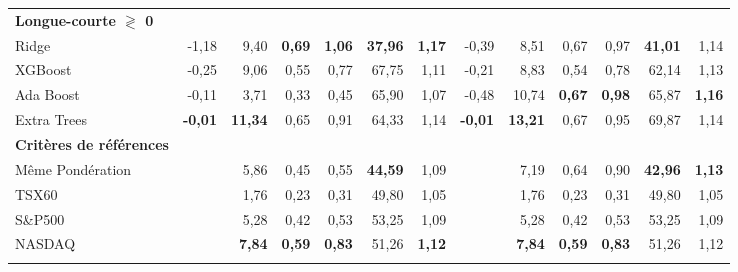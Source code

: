 \documentclass[11pt]{article}
\begin{document}
\begin{table}[h]
{\begin{tabular}{l *{6}{R} | *{6}{R}}
\textbf{Longue-courte $\gtrless$ 0} & & & & & & & & & & & & \\
\addlinespace[0.1cm]
Ridge & -1,18 & 9,40 & \bfseries0,69 & \bfseries1,06 & \bfseries\color{Green}37,96 & \bfseries\color{Green}1,17 & -0,39 & 8,51 & 0,67 & 0,97 & \bfseries\color{Green}41,01 & 1,14 \\ \addlinespace[0.1cm]
XGBoost & -0,25 & 9,06 & 0,55 & 0,77 & 67,75 & 1,11 & -0,21 & 8,83 & 0,54 & 0,78 & 62,14 & 1,13 \\ \addlinespace[0.1cm]
Ada Boost & -0,11 & 3,71 & 0,33 & 0,45 & 65,90 & 1,07 & -0,48 & 10,74 & \bfseries0,67 & \bfseries0,98 & 65,87 & \bfseries\color{Green}1,16 \\ \addlinespace[0.1cm]
Extra Trees & \bfseries\color{Green}-0,01 & \bfseries11,34 & 0,65 & 0,91 & 64,33 & 1,14 & \bfseries\color{Green}-0,01 & \bfseries13,21 & 0,67 & 0,95 & 69,87 & 1,14 \\ \addlinespace[0.1cm]
\textbf{Critères de références} & & & & & & & & & & & & \\
\addlinespace[0.1cm]
Même Pondération & & 5,86 & 0,45 & 0,55 & \bfseries44,59 & 1,09 & & 7,19 & 0,64 & 0,90 & \bfseries42,96 & \bfseries1,13 \\ 
\addlinespace[0.1cm]
TSX60 & & 1,76 & 0,23 & 0,31 & 49,80 & 1,05 & & 1,76 & 0,23 & 0,31 & 49,80 & 1,05 \\ 
\addlinespace[0.1cm]
S\&P500 & & 5,28 & 0,42 & 0,53 & 53,25 & 1,09 & & 5,28 & 0,42 & 0,53 & 53,25 & 1,09 \\ 
\addlinespace[0.1cm]
NASDAQ & & \bfseries7,84 & \bfseries0,59 & \bfseries0,83 & 51,26 & \bfseries1,12 & & \bfseries7,84 & \bfseries0,59 & \bfseries0,83 & 51,26 & 1,12 \\ 
\addlinespace[0.1cm]
\midrule
\bottomrule
\end{tabular}}
\end{table}
 
\newpage
\end{document}
